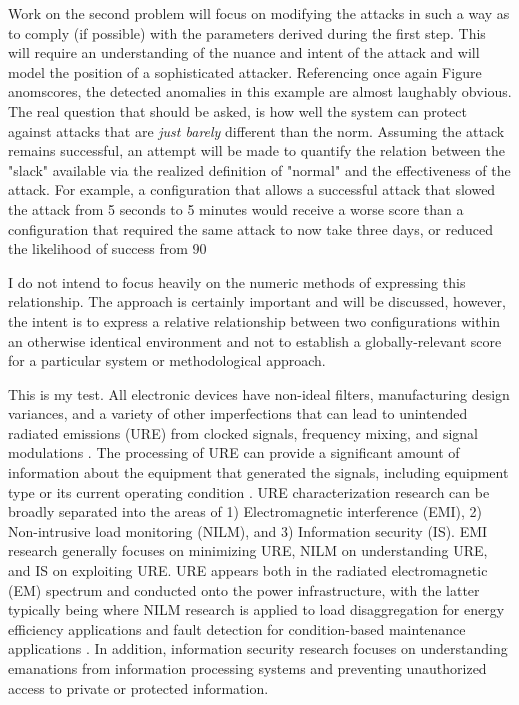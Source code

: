 Work on the second problem will focus on modifying the attacks in such a way as to comply (if possible) with the parameters derived during the first step. This will require an understanding of the nuance and intent of the attack and will model the position of a sophisticated attacker. Referencing once again Figure anomscores, the detected anomalies in this example are almost laughably obvious. The real question that should be asked, is how well the system can protect against attacks that are \emph{just barely} different than the norm. Assuming the attack remains successful, an attempt will be made to quantify the relation between the "slack" available via the realized definition of "normal" and the effectiveness of the attack. For example, a configuration that allows a successful attack that slowed the attack from 5 seconds to 5 minutes would receive a worse score than a configuration that required the same attack to now take three days, or reduced the likelihood of success from 90%

I do not intend to focus heavily on the numeric methods of expressing this relationship. The approach is certainly important and will be discussed, however, the intent is to express a relative relationship between two configurations within an otherwise identical environment and not to establish a globally-relevant score for a particular system or methodological approach.


This is my test. All electronic devices have non-ideal filters, manufacturing design variances, and a variety of other imperfections that can lead to unintended radiated emissions (URE) from clocked signals, frequency mixing, and signal modulations \cite{Stagner2014, Boroyevich2014, Meynard2011, Prvulovic2017}.  The processing of URE can provide a significant amount of information about the equipment that generated the signals, including equipment type \cite{Wang2012} or its current operating condition \cite{Vuagnoux2009}.  URE characterization research can be broadly separated into the areas of 1) Electromagnetic interference (EMI), 2) Non-intrusive load monitoring (NILM), and 3) Information security (IS). EMI research generally focuses on minimizing URE, NILM on understanding URE, and IS on exploiting URE.  URE appears both in the radiated electromagnetic (EM) spectrum and conducted onto the power infrastructure, with the latter typically being where NILM research is applied to load disaggregation for energy efficiency applications and fault detection for condition-based maintenance applications \cite{Harrold1979, Maughan2010, Timperley2017}.   In addition, information security research focuses on understanding emanations from information processing systems and preventing unauthorized access to private or protected information. 

